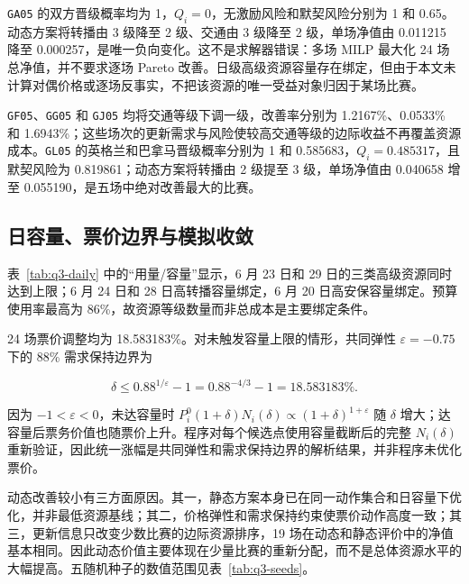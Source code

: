 \begin{table}[htbp]
\centering
\caption{五场比赛的静态、动态动作与净值}
\label{tab:q3-case-actions}
\scriptsize
\resizebox{\textwidth}{!}{}
\end{table}

\texttt{GA05} 的双方晋级概率均为 1，$Q_i=0$，无激励风险和默契风险分别为 1 和 0.65。动态方案将转播由 3 级降至 2 级、交通由 3 级降至 2 级，单场净值由 0.011215 降至 0.000257，是唯一负向变化。这不是求解器错误：多场 MILP 最大化 24 场总净值，并不要求逐场 Pareto 改善。日级高级资源容量存在绑定，但由于本文未计算对偶价格或逐场反事实，不把该资源的唯一受益对象归因于某场比赛。

\texttt{GF05}、\texttt{GG05} 和 \texttt{GJ05} 均将交通等级下调一级，改善率分别为 1.2167\%、0.0533\% 和 1.6943\%；这些场次的更新需求与风险使较高交通等级的边际收益不再覆盖资源成本。\texttt{GL05} 的英格兰和巴拿马晋级概率分别为 1 和 0.585683，$Q_i=0.485317$，且默契风险为 0.819861；动态方案将转播由 2 级提至 3 级，单场净值由 0.040658 增至 0.055190，是五场中绝对改善最大的比赛。

\subsection{日容量、票价边界与模拟收敛}

表~\ref{tab:q3-daily} 中的“用量/容量”显示，6 月 23 日和 29 日的三类高级资源同时达到上限；6 月 24 日和 28 日高转播容量绑定，6 月 20 日高安保容量绑定。预算使用率最高为 86\%，故资源等级数量而非总成本是主要绑定条件。

\begin{table}[htbp]
\centering
\caption{第三轮每日资源使用量与容量}
\label{tab:q3-daily}
\scriptsize
\resizebox{0.92\textwidth}{!}{}
\end{table}

24 场票价调整均为 18.583183\%。对未触发容量上限的情形，共同弹性 $\varepsilon=-0.75$ 下的 88\% 需求保持边界为

\[
\delta\le 0.88^{1/\varepsilon}-1
=0.88^{-4/3}-1=18.583183\%.
\]

因为 $-1<\varepsilon<0$，未达容量时 $P_i^0(1+\delta)N_i(\delta)\propto(1+\delta)^{1+\varepsilon}$ 随 $\delta$ 增大；达容量后票务价值也随票价上升。程序对每个候选点使用容量截断后的完整 $N_i(\delta)$ 重新验证，因此统一涨幅是共同弹性和需求保持边界的解析结果，并非程序未优化票价。

动态改善较小有三方面原因。其一，静态方案本身已在同一动作集合和日容量下优化，并非最低资源基线；其二，价格弹性和需求保持约束使票价动作高度一致；其三，更新信息只改变少数比赛的边际资源排序，19 场在动态和静态评价中的净值基本相同。因此动态价值主要体现在少量比赛的重新分配，而不是总体资源水平的大幅提高。五随机种子的数值范围见表~\ref{tab:q3-seeds}。


